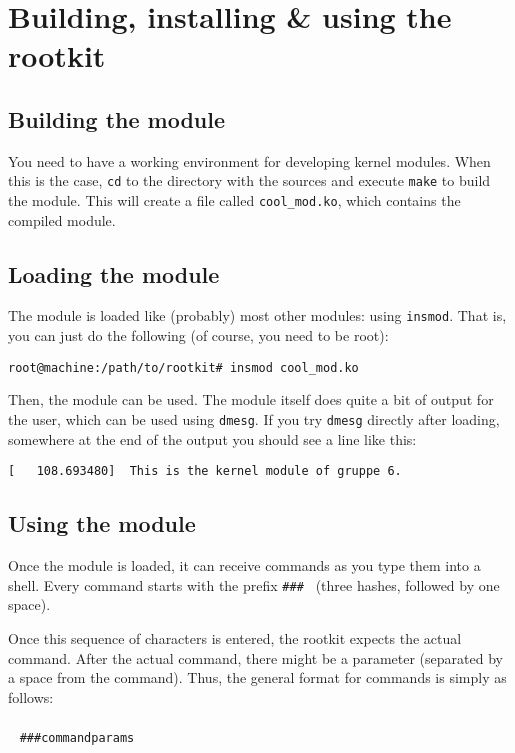 \documentclass[10pt, letterpaper]{scrartcl}
\begin{document}
\section{Building, installing \& using the rootkit}

\subsection{Building the module}

You need to have a working environment for developing kernel modules. When this is the case, \texttt{cd} to the directory with the sources and execute \texttt{make} to build the module. This will create a file called \texttt{cool\_mod.ko}, which contains the compiled module.

\subsection{Loading the module}

The module is loaded like (probably) most other modules: using \texttt{insmod}. That is, you can just do the following (of course, you need to be root):

\begin{verbatim}
root@machine:/path/to/rootkit# insmod cool_mod.ko
\end{verbatim}

Then, the module can be used. The module itself does quite a bit of output for the user, which can be used using \texttt{dmesg}. If you try \texttt{dmesg} directly after loading, somewhere at the end of the output you should see a line like this:

\begin{verbatim}
[   108.693480]  This is the kernel module of gruppe 6.
\end{verbatim}

\subsection{Using the module}

\label{sec:using-the-module}

Once the module is loaded, it can receive commands as you type them into a shell. Every command starts with the prefix \texttt{\#\#\# } (three hashes, followed by one space).

Once this sequence of characters is entered, the rootkit expects the actual command. After the actual command, there might be a parameter (separated by a space from the command). Thus, the general format for commands is simply as follows:
\\~
\\~
\texttt{\#\#\#\textvisiblespace command\textvisiblespace params\textvisiblespace
}
\end{document}

